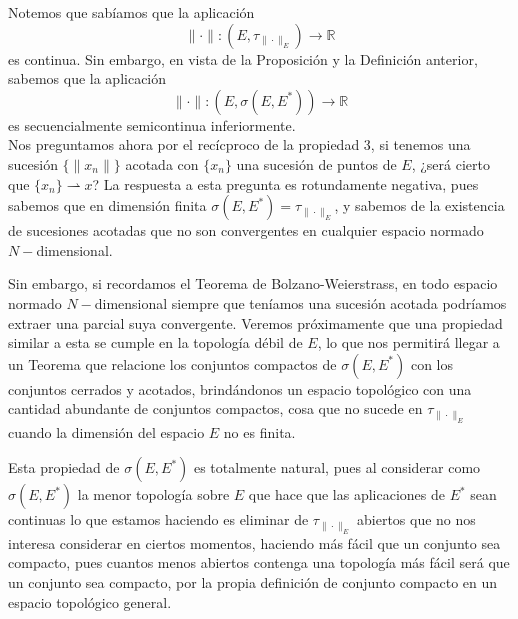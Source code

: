 \noindent
Notemos que sabíamos que la aplicación 
\begin{equation*}
    \|\cdot \|:(E,\tau_{\|\cdot \|_E})\to \mathbb{R}
\end{equation*}
es continua. Sin embargo, en vista de la Proposición y la Definición anterior, sabemos que la aplicación 
\begin{equation*}
    \|\cdot \|:(E,\sigma(E,E^\ast))\to \mathbb{R}
\end{equation*}
es secuencialmente semicontinua inferiormente.\\

\noindent
Nos preguntamos ahora por el recícproco de la propiedad 3, si tenemos una sucesión $\{\|x_n\|\}$ acotada con $\{x_n\}$ una sucesión de puntos de $E$, ¿será cierto que $\{x_n\}\rightharpoonup x$? La respuesta a esta pregunta es rotundamente negativa, pues sabemos que en dimensión finita $\sigma(E,E^\ast) = \tau_{\|\cdot \|_E}$, y sabemos de la existencia de sucesiones acotadas que no son convergentes en cualquier espacio normado $N-$dimensional.

Sin embargo, si recordamos el Teorema de Bolzano-Weierstrass, en todo espacio normado $N-$dimensional siempre que teníamos una sucesión acotada podríamos extraer una parcial suya convergente. Veremos próximamente que una propiedad similar a esta se cumple en la topología débil de $E$, lo que nos permitirá llegar a un Teorema que relacione los conjuntos compactos de $\sigma(E,E^\ast)$ con los conjuntos cerrados y acotados, brindándonos un espacio topológico con una cantidad abundante de conjuntos compactos, cosa que no sucede en $\tau_{\|\cdot \|_E}$ cuando la dimensión del espacio $E$ no es finita.

Esta propiedad de $\sigma(E,E^\ast)$ es totalmente natural, pues al considerar como $\sigma(E,E^\ast)$ la menor topología sobre $E$ que hace que las aplicaciones de $E^\ast$ sean continuas lo que estamos haciendo es eliminar de $\tau_{\|\cdot \|_E}$ abiertos que no nos interesa considerar en ciertos momentos, haciendo más fácil que un conjunto sea compacto, pues cuantos menos abiertos contenga una topología más fácil será que un conjunto sea compacto, por la propia definición de conjunto compacto en un espacio topológico general.

